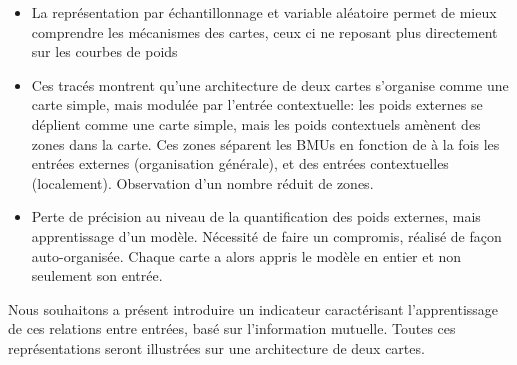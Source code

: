\begin{itemize}
\item La représentation par échantillonnage et variable aléatoire permet de mieux comprendre les mécanismes des cartes, ceux ci ne reposant plus directement sur les courbes de poids
\item Ces tracés montrent qu'une architecture de deux cartes s'organise comme une carte simple, mais modulée par l'entrée contextuelle: les poids externes se déplient comme une carte simple, mais les poids contextuels amènent des zones dans la carte. Ces zones séparent les BMUs en fonction de à la fois les entrées externes (organisation générale), et des entrées contextuelles (localement). Observation d'un nombre réduit de zones. 
\item Perte de précision au niveau de la quantification des poids externes, mais apprentissage d'un modèle. Nécessité de faire un compromis, réalisé de façon auto-organisée. Chaque carte a alors appris le modèle en entier et non seulement son entrée.
\end{itemize}

Nous souhaitons a présent introduire un indicateur caractérisant l'apprentissage de ces relations entre entrées, basé sur l'information mutuelle. Toutes ces représentations seront illustrées sur une architecture de deux cartes.


